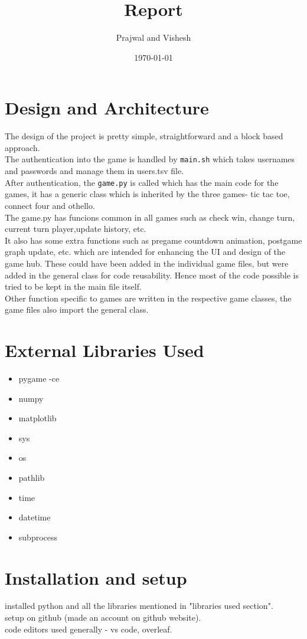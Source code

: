 \documentclass[12pt]{article}
\title{Report}
\author{Prajwal and Vishesh}
\date{\today}
\begin{document}
\maketitle

\tableofcontents
\clearpage
\section{Design and Architecture}
The design of the project is pretty simple, straightforward and a block based approach. \\
The authentication into the game is handled by \texttt{main.sh} which takes usernames and passwords and manage them in users.tsv file.\\
After authentication, the \texttt{game.py} is called which has the main code for the games, it has a generic class which is inherited by the three games- tic tac toe, connect four and othello.\\
The game.py has funcions common in all games such as check win, change turn, current turn player,update history, etc.\\
It also has some extra functions such as pregame countdown animation, postgame graph update, etc. which are intended for enhancing the UI and design of the game hub. These could have been added in the individual game files, but were added in the general class for code reusability. Hence most of the code possible is tried to be kept in the main file itself.\\
Other function specific to games are written in the respective game classes, the game files also import the general class.\\

\section{External Libraries Used}
\begin{itemize}
    \item pygame -ce
    \item numpy
    \item matplotlib
    \item sys
    \item os
    \item pathlib
    \item time
    \item datetime
    \item subprocess
\end{itemize}
\clearpage
\section{Installation and setup}
installed python and all the libraries mentioned in "libraries used section".\\
setup on github (made an account on github website).\\
code editors used generally - vs code, overleaf.
\end{document}
